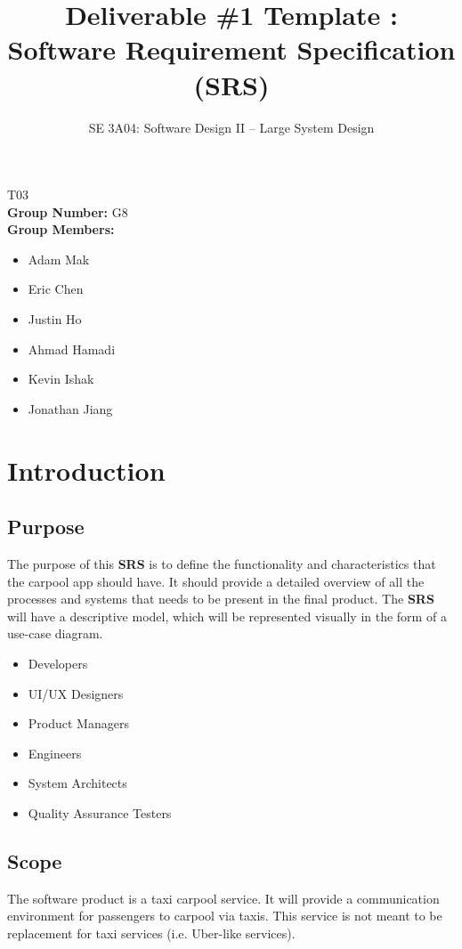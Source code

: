 \documentclass[]{article}
\title{Deliverable \#1 Template : Software Requirement Specification (\textbf{SRS})}
\author{SE 3A04: Software Design II -- Large System Design}
\date{}
\begin{document}
\maketitle\begin{center}
 T03\\
{\bf Group Number:} G8 \\
{\bf Group Members:} 
\begin{itemize} \centering
	\item Adam Mak
	\item Eric Chen
	\item Justin Ho
	\item Ahmad Hamadi
	\item Kevin Ishak
	\item Jonathan Jiang
\end{itemize}
\end{center}

\newpage
\section{Introduction}
\label{sec:introduction}

\subsection{Purpose}
\label{sub:purpose}
The purpose of this \textbf{SRS} is to define the functionality and characteristics that the carpool app should have. It should provide a detailed overview of all the processes and systems that needs to be present in the final product. The \textbf{SRS} will have a descriptive model, which will be represented visually in the form of a use-case diagram.
\begin{itemize}
	\item Developers
	\item UI/UX Designers
	\item Product Managers
	\item Engineers
	\item System Architects
	\item Quality Assurance Testers
\end{itemize}

\subsection{Scope}
\label{sub:scope}
The software product is a taxi carpool service. It will provide a communication environment for passengers to carpool via taxis. This service is not meant to be replacement for taxi services (i.e. Uber-like services).
\end{document}
